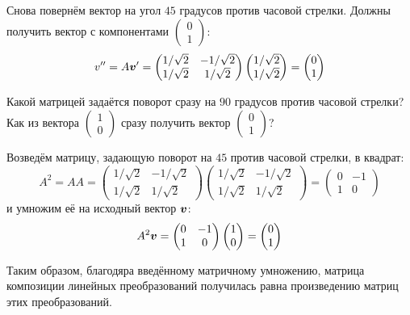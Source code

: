 \documentclass[a4paper,12pt]{article}
\begin{document}
\begin{remark}
    Снова повернём вектор на угол $45$ градусов против часовой стрелки.
    Должны получить вектор с компонентами $\left(\begin{smallmatrix}0 \\ 1\end{smallmatrix}\right)$:
    \[
      v''
      = A \boldsymbol v'
      = \begin{pmatrix}
          1/\sqrt{2} & -1/\sqrt{2}\\
          1/\sqrt{2} & 1/\sqrt{2}
        \end{pmatrix}
        \begin{pmatrix}
          1/\sqrt{2} \\ 1/\sqrt{2}
        \end{pmatrix}
      = \begin{pmatrix}
          0 \\ 1
        \end{pmatrix}
    \]
    
    Какой матрицей задаётся поворот сразу на $90$ градусов против часовой стрелки?
    Как из вектора
    $\left(\begin{smallmatrix}1 \\ 0\end{smallmatrix}\right)$
    сразу получить вектор
    $\left(\begin{smallmatrix}0 \\ 1\end{smallmatrix}\right)$?
    
    Возведём матрицу, задающую поворот на $45$ против часовой стрелки, в квадрат:
    \[
      A^2
      = A A
      = \begin{pmatrix}
          1/\sqrt{2} & -1/\sqrt{2}\\
          1/\sqrt{2} & 1/\sqrt{2}
        \end{pmatrix}
        \begin{pmatrix}
          1/\sqrt{2} & -1/\sqrt{2}\\
          1/\sqrt{2} & 1/\sqrt{2}
        \end{pmatrix}
      = \begin{pmatrix}
          0 & -1\\
          1 & 0
        \end{pmatrix}
    \]
    и умножим её на исходный вектор $\boldsymbol v$:
    \[
      A^2 \boldsymbol v
      = \begin{pmatrix}
          0 & -1\\
          1 & 0
        \end{pmatrix}
        \begin{pmatrix}
          1 \\ 0
        \end{pmatrix}
      = \begin{pmatrix}
          0 \\ 1
        \end{pmatrix}
    \]
    
    Таким образом, благодяра введённому матричному умножению, матрица композиции линейных преобразований получилась равна произведению матриц этих преобразований.
  \end{remark}
  
\end{document}
